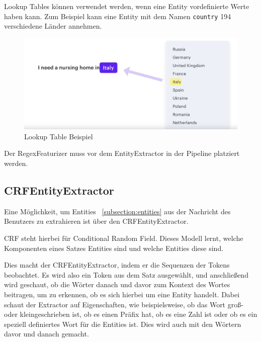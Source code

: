 Lookup Tables können verwendet werden, wenn eine Entity vordefinierte Werte haben kann.
Zum Beispiel kann eine Entity mit dem Namen \texttt{country} 194 verschiedene Länder annehmen.\cite{rasaMasterclassRegexFeaturizer, pipelineComponentsYoutube, regexFeaturizerCrf}

\begin{figure}[hbt!]
    \centering
    \includegraphics[scale=0.25]{pics/lookup-table-example}
    \caption{Lookup Table Beispiel~\cite{pipelineComponentsYoutube}}
    \label{fig:Lookup Table Beispiel}
\end{figure}

Der RegexFeaturizer muss vor dem EntityExtractor in der Pipeline platziert werden.\cite{rasaMasterclassRegexFeaturizer, pipelineComponentsYoutube, regexFeaturizerCrf}

\subsection{CRFEntityExtractor}\label{subsec:crfentityextractor}

Eine Möglichkeit, um Entities ~\ref{subsection:entities} aus der Nachricht des Benutzers zu extrahieren ist über den CRFEntityExtractor.\cite{crfEntityExtractor}

CRF steht hierbei für Conditional Random Field.
Dieses Modell lernt, welche Komponenten eines Satzes Entities sind und welche Entities diese sind.\cite{crfEntityExtractor, pipelineComponentsYoutube, regexFeaturizerCrf}

Dies macht der CRFEntityExtractor, indem er die Sequenzen der Tokens beobachtet.
Es wird also ein Token aus dem Satz ausgewählt, und anschließend wird geschaut, ob die Wörter danach und davor zum Kontext des Wortes beitragen, um zu erkennen, ob es sich hierbei um eine Entity handelt.
Dabei schaut der Extractor auf Eigenschaften, wie beispielsweise, ob das Wort groß- oder kleingeschrieben ist, ob es einen Präfix hat, ob es eine Zahl ist oder ob es ein speziell definiertes Wort für die Entities ist.
Dies wird auch mit den Wörtern davor und danach gemacht.\cite{crfEntityExtractor, pipelineComponentsYoutube, regexFeaturizerCrf}

